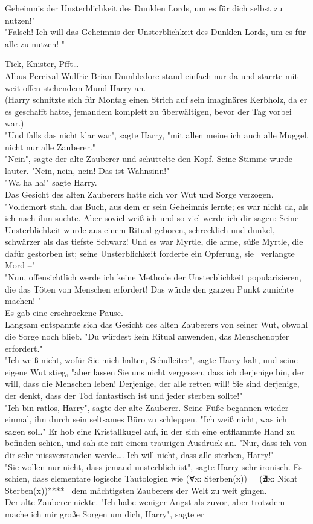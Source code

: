 {Geheimnis der Unsterblichkeit des Dunklen Lords, um es für dich selbst zu nutzen!"\\ "Falsch! Ich will das Geheimnis der Unsterblichkeit des Dunklen Lords, um es für alle zu nutzen! "

Tick, Knister, Pfft…\\ Albus Percival Wulfric Brian Dumbledore stand einfach nur da und starrte mit weit offen stehendem Mund Harry an.\\ (Harry schnitzte sich für Montag einen Strich auf sein imaginäres Kerbholz, da er es geschafft hatte, jemandem komplett zu überwältigen, bevor der Tag vorbei war.)\\ "Und falls das nicht klar war", sagte Harry, "mit allen meine ich auch alle Muggel, nicht nur alle Zauberer."\\ "Nein", sagte der alte Zauberer und schüttelte den Kopf. Seine Stimme wurde lauter. "Nein, nein, nein! Das ist Wahnsinn!"\\ "Wa ha ha!" sagte Harry.\\ Das Gesicht des alten Zauberers hatte sich vor Wut und Sorge verzogen. "Voldemort stahl das Buch, aus dem er sein Geheimnis lernte; es war nicht da, als ich nach ihm suchte. Aber soviel weiß ich und so viel werde ich dir sagen: Seine Unsterblichkeit wurde aus einem Ritual geboren, schrecklich und dunkel, schwärzer als das tiefste Schwarz! Und es war Myrtle, die arme, süße Myrtle, die dafür gestorben ist; seine Unsterblichkeit forderte ein Opferung, sie ~verlangte Mord --"\\ "Nun, offensichtlich werde ich keine Methode der Unsterblichkeit popularisieren, die das Töten von Menschen erfordert! Das würde den ganzen Punkt zunichte machen! "\\ Es gab eine erschrockene Pause.\\ Langsam entspannte sich das Gesicht des alten Zauberers von seiner Wut, obwohl die Sorge noch blieb. "Du würdest kein Ritual anwenden, das Menschenopfer erfordert."\\ "Ich weiß nicht, wofür Sie mich halten, Schulleiter", sagte Harry kalt, und seine eigene Wut stieg, "aber lassen Sie uns nicht vergessen, dass ich derjenige bin, der will, dass die Menschen leben! Derjenige, der alle retten will! Sie sind derjenige, der denkt, dass der Tod fantastisch ist und jeder sterben sollte!"\\ "Ich bin ratlos, Harry", sagte der alte Zauberer. Seine Füße begannen wieder einmal, ihn durch sein seltsames Büro zu schleppen. "Ich weiß nicht, was ich sagen soll." Er hob eine Kristallkugel auf, in der sich eine entflammte Hand zu befinden schien, und sah sie mit einem traurigen Ausdruck an. "Nur, dass ich von dir sehr missverstanden werde…. Ich will nicht, dass alle sterben, Harry!"\\ "Sie wollen nur nicht, dass jemand unsterblich ist", sagte Harry sehr ironisch. Es schien, dass elementare logische Tautologien wie (Ɐx: Sterben(x)) = (∄x: Nicht Sterben(x))**** ~dem mächtigsten Zauberers der Welt zu weit gingen.\\ Der alte Zauberer nickte. "Ich habe weniger Angst als zuvor, aber trotzdem mache ich mir große Sorgen um dich, Harry", sagte er }
